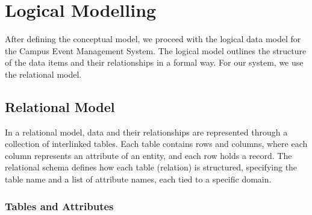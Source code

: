 \section{Logical Modelling}\label{sec:lm}
After defining the conceptual model, we proceed with the logical data model for the Campus Event Management System.
The logical model outlines the structure of the data items and their relationships in a formal way.
For our system, we use the relational model.
\subsection{Relational Model}
In a relational model, data and their relationships are represented through a collection of interlinked tables.
Each table contains rows and columns, where each column represents an attribute of an entity, and each row holds a record.
The relational schema defines how each table (relation) is structured, specifying the table name and a list of attribute names, each tied to a specific domain.

\subsubsection{Tables and Attributes}

